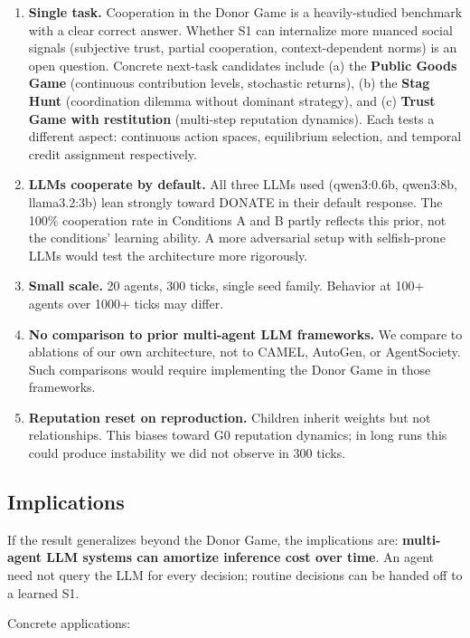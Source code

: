 \documentclass[
  11pt,
  letterpaper,
]{article}
\begin{document}
\begin{enumerate}
\def\labelenumi{\arabic{enumi}.}
\item
  \textbf{Single task.} Cooperation in the Donor Game is a
  heavily-studied benchmark with a clear correct answer. Whether S1 can
  internalize more nuanced social signals (subjective trust, partial
  cooperation, context-dependent norms) is an open question. Concrete
  next-task candidates include (a) the \textbf{Public Goods Game}
  (continuous contribution levels, stochastic returns), (b) the
  \textbf{Stag Hunt} (coordination dilemma without dominant strategy),
  and (c) \textbf{Trust Game with restitution} (multi-step reputation
  dynamics). Each tests a different aspect: continuous action spaces,
  equilibrium selection, and temporal credit assignment respectively.
\item
  \textbf{LLMs cooperate by default.} All three LLMs used (qwen3:0.6b,
  qwen3:8b, llama3.2:3b) lean strongly toward DONATE in their default
  response. The 100\% cooperation rate in Conditions A and B partly
  reflects this prior, not the conditions' learning ability. A more
  adversarial setup with selfish-prone LLMs would test the architecture
  more rigorously.
\item
  \textbf{Small scale.} 20 agents, 300 ticks, single seed family.
  Behavior at 100+ agents over 1000+ ticks may differ.
\item
  \textbf{No comparison to prior multi-agent LLM frameworks.} We compare
  to ablations of our own architecture, not to CAMEL, AutoGen, or
  AgentSociety. Such comparisons would require implementing the Donor
  Game in those frameworks.
\item
  \textbf{Reputation reset on reproduction.} Children inherit weights
  but not relationships. This biases toward G0 reputation dynamics; in
  long runs this could produce instability we did not observe in 300
  ticks.
\end{enumerate}

\subsection{Implications}\label{implications}

If the result generalizes beyond the Donor Game, the implications are:
\textbf{multi-agent LLM systems can amortize inference cost over time}.
An agent need not query the LLM for every decision; routine decisions
can be handed off to a learned S1.

Concrete applications:
\end{document}
